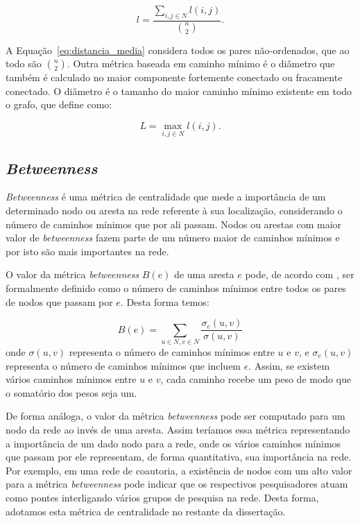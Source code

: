 \begin{equation}
\label{eq:distancia_media}
\textit{\=l} = \frac{\sum_{i,j \in N}{l(i,j)}}{\binom{n}{2}}.
\end{equation}

A Equação~\ref{eq:distancia_media} considera todos os pares não-ordenados, que ao todo são $\binom{n}{2}$. Outra métrica baseada 
em caminho mínimo é o diâmetro que também é calculado no maior componente fortemente conectado ou fracamente conectado. O 
diâmetro é o tamanho do maior caminho mínimo existente em todo o grafo, que \cite{Figueiredo2011} define como:

\begin{equation}
\label{eq:diametro}
\textit{L} = \max_{i,j\in N} l(i,j).
\end{equation}


\subsection{\textit{Betweenness}}

\textit{Betweenness} é uma métrica de centralidade que mede a importância de um determinado nodo ou aresta na rede 
referente à sua localização, considerando o número de caminhos mínimos que por ali passam. Nodos ou arestas com maior 
valor de \textit{betweenness} fazem parte de um número maior de caminhos mínimos e por isto são mais importantes na rede.

O valor da métrica \textit{betweenness} $B(e)$ de uma aresta $e$ pode, de acordo com \cite{Benevenuto2012}, ser formalmente definido como o 
número de caminhos mínimos entre todos os pares de nodos que passam por $e$. Desta forma temos:

\begin{equation}
\label{eq:betweenness}
B(e)=\sum_{u \in N, v \in N} \frac{\sigma_e (u,v)}{\sigma (u,v)}
\end{equation}
onde $\sigma (u,v)$ representa o número de caminhos mínimos entre $u$ e $v$, e $\sigma_e (u,v)$ representa o número de 
caminhos mínimos que incluem $e$. Assim, se existem vários caminhos mínimos entre $u$ e $v$, cada caminho recebe
um peso de modo que o somatório dos pesos seja um.

De forma análoga, o valor da métrica \textit{betweenness} pode ser computado para um nodo da rede ao invés de uma aresta. Assim teríamos
essa métrica representando a importância de um dado nodo para a rede, onde os vários caminhos mínimos que passam
por ele representam, de forma quantitativa, sua importância na rede. Por exemplo, em uma rede de coautoria, a existência de nodos com um alto valor
para a métrica \textit{betweenness} pode indicar que os respectivos pesquisadores atuam como pontes interligando vários grupos de pesquisa na rede. 
Desta forma, adotamos esta métrica de centralidade no restante da dissertação.

